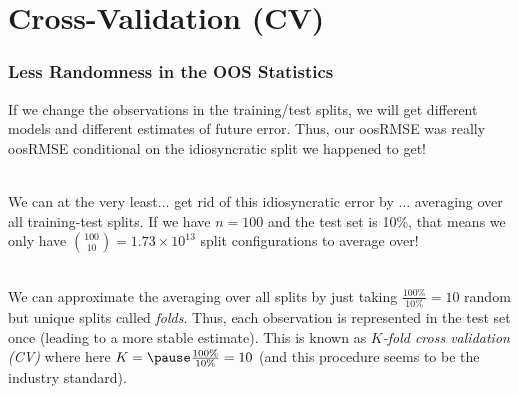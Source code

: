 \documentclass[handout]{beamer}
\begin{document}
\section{Cross-Validation (CV)}

\begin{frame}\frametitle{Less Randomness in the OOS Statistics}
\small
If we change the observations in the training/test splits, we will get different models and different estimates of future error. \pause Thus, our oosRMSE was really oosRMSE conditional on the idiosyncratic split we happened to get!\\~\\ \pause 

We can at the very least... \pause  get rid of this idiosyncratic error by ... \pause averaging over all training-test splits. If we have $n=100$ and the test set is 10\%, that means we only have $\binom{100}{10} = 1.73 \times 10^{13}$ split configurations to average over! \\~\\ \pause 

\normalsize
We can approximate the averaging over all splits by just taking $\frac{100\%}{10\%} = 10$ random but unique splits called \emph{folds}. \pause Thus, each observation is represented in the test set once (leading to a more stable estimate). \pause This is known as \emph{$K$-fold cross validation (CV)} where here $K = \pause \frac{100\%}{10\%} = 10$ (and this procedure seems to be the industry standard).
	
\end{frame}
\end{document}
